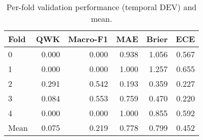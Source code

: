 \begin{table}
\caption{Per-fold validation performance (temporal DEV) and mean.}
\label{tab:cv-performance}
\begin{tabular}{lrrrrr}
\toprule
Fold & QWK & Macro-F1 & MAE & Brier & ECE \\
\midrule
0 & 0.000 & 0.000 & 0.938 & 1.056 & 0.567 \\
1 & 0.000 & 0.000 & 1.000 & 1.257 & 0.655 \\
2 & 0.291 & 0.542 & 0.193 & 0.359 & 0.227 \\
3 & 0.084 & 0.553 & 0.759 & 0.470 & 0.220 \\
4 & 0.000 & 0.000 & 1.000 & 0.855 & 0.592 \\
Mean & 0.075 & 0.219 & 0.778 & 0.799 & 0.452 \\
\bottomrule
\end{tabular}
\end{table}
